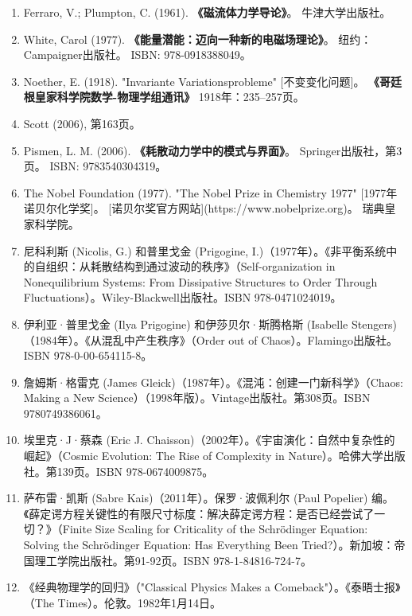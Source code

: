 \begin{enumerate}
\item Ferraro, V.; Plumpton, C. (1961).  
  \textbf{《磁流体力学导论》}。  
  牛津大学出版社。  
\item White, Carol (1977).  
  \textbf{《能量潜能：迈向一种新的电磁场理论》}。  
  纽约：Campaigner出版社。  
  ISBN: 978-0918388049。  
\item Noether, E. (1918). 
  "Invariante Variationsprobleme" [不变变化问题]。  
  \textbf{《哥廷根皇家科学院数学-物理学组通讯》} 1918年：235–257页。  
\item Scott (2006), 第163页。 
\item Pismen, L. M. (2006). 
  \textbf{《耗散动力学中的模式与界面》}。  
  Springer出版社，第3页。  
  ISBN: 9783540304319。  
\item The Nobel Foundation (1977).  
  "The Nobel Prize in Chemistry 1977" [1977年诺贝尔化学奖]。  
  [诺贝尔奖官方网站](https://www.nobelprize.org)。  
  瑞典皇家科学院。

\item 尼科利斯 (Nicolis, G.) 和普里戈金 (Prigogine, I.)（1977年）。《非平衡系统中的自组织：从耗散结构到通过波动的秩序》（Self-organization in Nonequilibrium Systems: From Dissipative Structures to Order Through Fluctuations）。Wiley-Blackwell出版社。ISBN 978-0471024019。

\item 伊利亚·普里戈金 (Ilya Prigogine) 和伊莎贝尔·斯腾格斯 (Isabelle Stengers)（1984年）。《从混乱中产生秩序》（Order out of Chaos）。Flamingo出版社。ISBN 978-0-00-654115-8。

\item 詹姆斯·格雷克 (James Gleick)（1987年）。《混沌：创建一门新科学》（Chaos: Making a New Science）（1998年版）。Vintage出版社。第308页。ISBN 9780749386061。

\item 埃里克·J·蔡森 (Eric J. Chaisson)（2002年）。《宇宙演化：自然中复杂性的崛起》（Cosmic Evolution: The Rise of Complexity in Nature）。哈佛大学出版社。第139页。ISBN 978-0674009875。

\item 萨布雷·凯斯 (Sabre Kais)（2011年）。保罗·波佩利尔 (Paul Popelier) 编。《薛定谔方程关键性的有限尺寸标度：解决薛定谔方程：是否已经尝试了一切？》（Finite Size Scaling for Criticality of the Schrödinger Equation: Solving the Schrödinger Equation: Has Everything Been Tried?）。新加坡：帝国理工学院出版社。第91-92页。ISBN 978-1-84816-724-7。

\item 《经典物理学的回归》（"Classical Physics Makes a Comeback"）。《泰晤士报》（The Times）。伦敦。1982年1月14日。


\end{enumerate}
